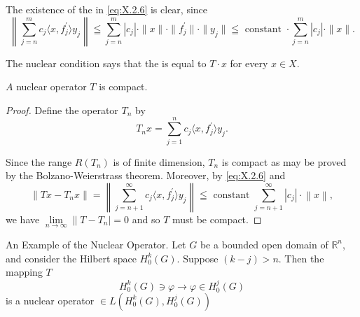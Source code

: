 \begin{remarku} The existence of the \slim in \eqref{eq:X.2.6} is clear, since 
\[
\left\| \sum\limits_{j=n} ^{m} c _{j} \langle x, f _{j} ^{\prime} \rangle y _{j} \right\| \leqq \sum\limits_{j=n} ^{m} | c _{j} | \cdot \| x \| \cdot \| f _{j} ^{\prime} \| \cdot \| y _{j} \| \leqq \text{ constant } \cdot \sum\limits_{j=n} ^{m} | c _{j} | \cdot \| x \|.
\]
\end{remarku}

The nuclear condition says that the \slim is equal to $T \cdot x$ for every $x \in X$. 

\begin{propositionu} $A$ nuclear operator $T$ is compact. 
\end{propositionu}

\begin{proof}
 Define the operator $T_{n}$ by 
\begin{equation}\label{eq:X.2.7}
T _{n} x = \sum\limits_{j=1} ^{n} c _{j} \langle x, f _{j} ^{\prime} \rangle y _{j}. \end{equation}

Since the range $R(T_{n})$ is of finite dimension, $T_{n}$ is compact as may be proved by the Bolzano-Weierstrass theorem. Moreover, by \eqref{eq:X.2.6} and 
\[
\left\| T x - T _{n} x \right\| = \left\| \sum\limits_{j=n+1} ^{\infty} c _{j} \langle x, f _{j} ^{\prime} \rangle y _{j} \right\| \leqq \text{ constant } \sum\limits_{j=n+1} ^{\infty} \left| c _{j} \right| \cdot \left\| x \right\|,
\]
we have $\lim\limits_{n\to \infty}\left\|T - T_n\right| = 0$ and so $T$ must be compact. 
\end{proof}

An Example of the Nuclear Operator. Let $G$ be a bounded open domain of $\mathbb{R}^{n}$, and consider the Hilbert space $H_{0}^{k}(G)$. Suppose $(k-j)>n$. Then the mapping $T$ 
\begin{equation}\label{eq:X.2.8}
H _{0} ^{k} (G) \ni \varphi \rightarrow \varphi \in H _{0} ^{j} (G)
\end{equation}
is a nuclear operator $\in L(H_0^k (G),H_0^j (G))$ 

